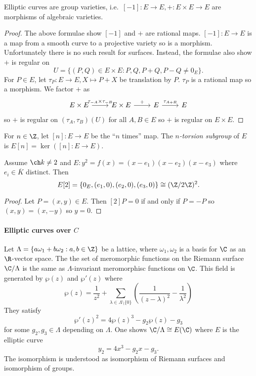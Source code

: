 \documentclass[a4paper]{article}
\theoremstyle{definition}
\begin{document}
\begin{theorem}
  Elliptic curves are group varieties, i.e.\ \([-1]: E \to E, +: E \times E \to E\) are morphisms of algebraic varieties.
\end{theorem}

\begin{proof}
  The above formulae show \([-1]\) and \(+\) are rational maps. \([-1]: E \to E\) is a map from a smooth curve to a projective variety so is a morphism. Unfortunately there is no such result for surfaces. Instead, the formulae also show \(+\) is regular on
  \[
    U = \{(P, Q) \in E \times E: P, Q, P + Q, P - Q \neq 0_E\}.
  \]
  For \(P \in E\), let \(\tau_P: E \to E, X \mapsto P + X\) be translation by \(P\). \(\tau_P\) is a rational map so a morphism. We factor \(+\) as
  \[
    \begin{tikzcd}
      E \times E \ar[r, "\tau_{-A} \times \tau_{-B}"] & E \times E \ar[r, "+"] & E \ar[r, "\tau_{A + B}"] & E
    \end{tikzcd}
  \]
  so \(+\) is regular on \((\tau_A, \tau_B)(U)\) for all \(A, B \in E\) so \(+\) is regular on \(E \times E\).
\end{proof}

\begin{definition}
  For \(n \in \Z\), let \([n]: E \to E\) be the ``\(n\) times'' map. The \emph{\(n\)-torsion subgroup} of \(E\) is \(E[n] = \ker([n]: E \to E)\).
\end{definition}

\begin{lemma}
  Assume \(\ch k \neq 2\) and \(E: y^2 = f(x) = (x - e_1)(x - e_2)(x - e_3)\) where \(e_i \in \overline K\) distinct. Then
  \[
    E[2] = \{0_E, (e_1, 0), (e_2, 0), (e_3, 0)\} \cong (\Z/2\Z)^2.
  \]
\end{lemma}

\begin{proof}
  Let \(P = (x, y) \in E\). Then \([2] P = 0\) if and only if \(P = - P\) so \((x, y) = (x, -y)\) so \(y = 0\).
\end{proof}

\paragraph{Elliptic curves over \(C\)}

Let \(\Lambda = \{a \omega_1 + b \omega_2: a, b \in \Z\}\) be a lattice, where \(\omega_1, \omega_2\) is a basis for \(\C\) as an \(\R\)-vector space. The the set of meromorphic functions on the Riemann surface \(\C/\Lambda\) is the same as \(\Lambda\)-invariant meromorphisc functions on \(\C\). This field is generated by \(\wp(z)\) and \(\wp'(z)\) where
\[
  \wp(z) = \frac{1}{z^2} + \sum_{\lambda \in \Lambda \setminus \{0\}} \left(\frac{1}{(z - \lambda)^2} - \frac{1}{\lambda^2}\right)
\]
They satisfy
\[
  \wp'(z)^2 = 4 \wp(z)^3 - g_2 \wp(z) - g_3
\]
for some \(g_2, g_3 \in \Lambda\) depending on \(\Lambda\). One shows \(\C/\Lambda \cong E(\C)\) where \(E\) is the elliptic curve
\[
  y_2 = 4x^3 - g_2x - g_3.
\]
The isomorphism is understood as isomorphism of Riemann surfaces and isomorphism of groups.
\end{document}
